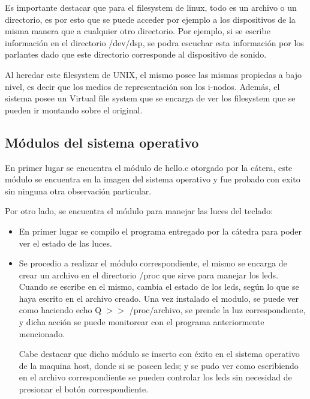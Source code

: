 \documentclass[a4paper, 12pt]{article}
\begin{document}
Es importante destacar que para el filesystem de linux, todo es un archivo o un directorio, es por esto que se puede acceder por ejemplo a los dispositivos de la misma manera que a cualquier otro directorio. Por ejemplo, si se escribe informaci\'on en el directorio /dev/dsp, se podra escuchar esta informaci\'on por los parlantes dado que este directorio corresponde al dispositivo de sonido.

Al heredar este filesystem de UNIX, el mismo posee las mismas propiedas a bajo nivel, es decir que los medios de representaci\'on son los i-nodos. Adem\'as, el sistema posee un Virtual file system que se encarga de ver los filesystem que se pueden ir montando sobre el original. 


\subsection*{M\'odulos del sistema operativo}

En primer lugar se encuentra el m\'odulo de hello.c otorgado por la c\'atera, este m\'odulo se encuentra en la imagen del sistema operativo y fue probado con exito sin ninguna otra observaci\'on particular.

\bigskip

Por otro lado, se encuentra el m\'odulo para manejar las luces del teclado:
\begin{itemize}
\item En primer lugar se compilo el programa entregado por la c\'atedra para poder ver el estado de las luces.
\item Se procedio a realizar el m\'odulo correspondiente, el mismo se encarga de crear un archivo en el directorio /proc que sirve para manejar los leds. Cuando se escribe en el mismo, cambia el estado de los leds, seg\'un lo que se haya escrito en el archivo creado. Una vez instalado el modulo, se puede ver como haciendo echo Q $>>$ /proc/archivo, se prende la luz correspondiente, y dicha acci\'on se puede monitorear con el programa anteriormente mencionado. 

Cabe destacar que dicho m\'odulo se inserto con \'exito en el sistema operativo de la maquina host, donde si se poseen leds; y se pudo ver como escribiendo en el archivo correspondiente se pueden controlar los leds sin necesidad de presionar el bot\'on correspondiente.
\end{itemize}
\end{document}
